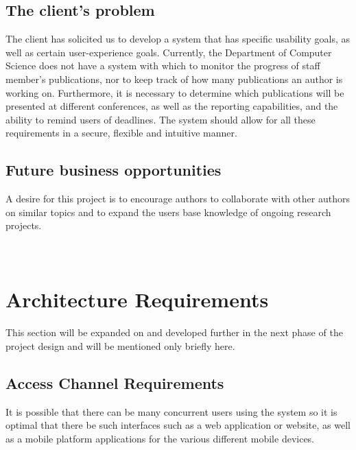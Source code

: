 \documentclass[a4paper]{article}
\begin{document}
	\subsection{The client's problem}
	The client has solicited us to develop a system that has specific usability goals, as well as certain user-experience goals. Currently, the Department of Computer Science does not have a system with which to monitor the progress of staff member's publications, nor to keep track of how many publications an author is working on. Furthermore, it is necessary to determine which publications will be presented at different conferences, as well as the reporting capabilities, and the ability to remind users of deadlines. The system should allow for all these requirements in a secure, flexible and intuitive manner.
	
	\subsection{Future business opportunities}
	A desire for this project is to encourage authors to collaborate with other authors on similar topics and to expand the users base knowledge of ongoing research projects.
	\\
	\\
	\\
	
	
	\section{Architecture Requirements}
	This section will be expanded on and developed further in the next phase of the project design and will be mentioned only briefly here.
	\\
	\subsection{Access Channel Requirements}
	It is possible that there can be many concurrent users using the system so it is optimal that there be such interfaces such as a web application or website, as well as a mobile platform applications for the various different mobile devices.
	\\
\end{document}
